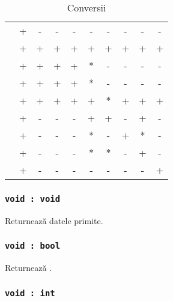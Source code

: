 \begin{table}[htb]
	\caption{Conversii}
	\label{castingtable}
	\begin{tabular}{|l|c|c|c|c|c|c|c|c|c|}
		\hline
		          & \void & \bool & \integer & \double & \str & \listtype & \object & \set & \element \\ \hline
		\void     & +     & -     & -        & -       & -    & -         & -       & -    & -        \\ \hline
		\bool     & +     & +     & +        & +       & +    & +         & +       & +    & +        \\ \hline
		\integer  & +     & +     & +        & +       & *    & -         & -       & -    & -        \\ \hline
		\double   & +     & +     & +        & +       & *    & -         & -       & -    & -        \\ \hline
		\str      & +     & +     & +        & +       & +    & *         & +       & +    & +        \\ \hline
		\listtype & +     & -     & -        & -       & +    & +         & -       & +    & -        \\ \hline
		\object   & +     & -     & -        & -       & *    & -         & +       & *    & -        \\ \hline
		\set      & +     & -     & -        & -       & *    & *         & -       & +    & -        \\ \hline
		\element  & +     & -     & -        & -       & -    & -         & -       & -    & +        \\ \hline
	\end{tabular}
\end{table}

\subsubsection{\lstinline|void : void|}

Returnează datele primite.

\subsubsection{\lstinline|void : bool|}

Returnează \false.

\subsubsection{\lstinline|void : int|}

